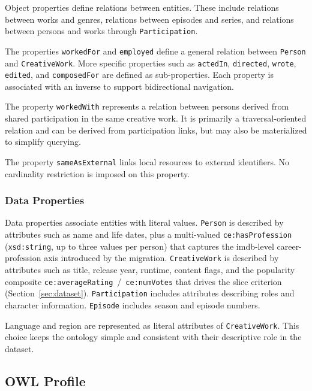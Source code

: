 Object properties define relations between entities. These include relations between works and genres, relations between episodes and series, and relations between persons and works through \texttt{Participation}.

The properties \texttt{workedFor} and \texttt{employed} define a general relation between \texttt{Person} and \texttt{CreativeWork}. More specific properties such as \texttt{actedIn}, \texttt{directed}, \texttt{wrote}, \texttt{edited}, and \texttt{composedFor} are defined as sub-properties. Each property is associated with an inverse to support bidirectional navigation.

The property \texttt{workedWith} represents a relation between persons derived from shared participation in the same creative work. It is primarily a traversal-oriented relation and can be derived from participation links, but may also be materialized to simplify querying.

The property \texttt{sameAsExternal} links local resources to external identifiers. No cardinality restriction is imposed on this property.

\subsubsection{Data Properties}

Data properties associate entities with literal values. \texttt{Person} is described by attributes such as name and life dates, plus a multi-valued \texttt{ce:hasProfession} (\texttt{xsd:string}, up to three values per person) that captures the \ac{imdb}-level career-profession axis introduced by the migration. \texttt{CreativeWork} is described by attributes such as title, release year, runtime, content flags, and the popularity composite \texttt{ce:averageRating}~/~\texttt{ce:numVotes} that drives the slice criterion (Section~\ref{sec:dataset}). \texttt{Participation} includes attributes describing roles and character information. \texttt{Episode} includes season and episode numbers.

Language and region are represented as literal attributes of \texttt{CreativeWork}. This choice keeps the ontology simple and consistent with their descriptive role in the dataset.

\subsection{OWL Profile}
\label{subsec:owl-profile}

